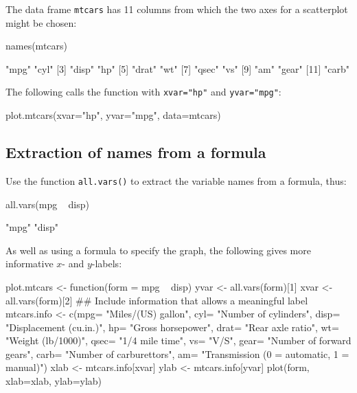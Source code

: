 \documentclass{tufte-book}\usepackage[]{graphicx}\usepackage[]{color}
\newcommand{\txtt}[1]{\texttt{#1}}
\begin{document}
\begin{marginfigure}
The data frame \txtt{mtcars} has 11 columns from which
the two axes for a scatterplot might be chosen:

\begin{Schunk}
\begin{Sinput}
names(mtcars)
\end{Sinput}
\begin{Soutput}
 [1] "mpg"  "cyl" 
 [3] "disp" "hp"  
 [5] "drat" "wt"  
 [7] "qsec" "vs"  
 [9] "am"   "gear"
[11] "carb"
\end{Soutput}
\end{Schunk}

\end{marginfigure}

The following calls the function with \txtt{xvar="hp"} and
\txtt{yvar="mpg"}:
\begin{Schunk}
\begin{Sinput}
plot.mtcars(xvar="hp", yvar="mpg", data=mtcars)
\end{Sinput}
\end{Schunk}

\subsection{Extraction of names from a formula}

Use the function \txtt{all.vars()} to extract the variable names from
a formula, thus:
\begin{Schunk}
\begin{Sinput}
all.vars(mpg ~ disp)
\end{Sinput}
\begin{Soutput}
[1] "mpg"  "disp"
\end{Soutput}
\end{Schunk}

As well as using a formula to specify the graph, the following gives
more informative $x$- and $y$-labels:
\begin{fullwidth}
\begin{Schunk}
\begin{Sinput}
plot.mtcars <- function(form = mpg ~ disp){
   yvar <- all.vars(form)[1]
   xvar <- all.vars(form)[2]
   ## Include information that allows a meaningful label
   mtcars.info <-
     c(mpg= "Miles/(US) gallon",        cyl= "Number of cylinders",
       disp= "Displacement (cu.in.)",   hp= "Gross horsepower",
       drat= "Rear axle ratio",         wt= "Weight (lb/1000)",
       qsec= "1/4 mile time",           vs= "V/S",
       gear= "Number of forward gears",
       carb= "Number of carburettors",
       am= "Transmission (0 = automatic, 1 = manual)")
   xlab <- mtcars.info[xvar]
   ylab <- mtcars.info[yvar]
   plot(form, xlab=xlab, ylab=ylab)
}
\end{Sinput}
\end{Schunk}
\end{fullwidth}
\end{document}
